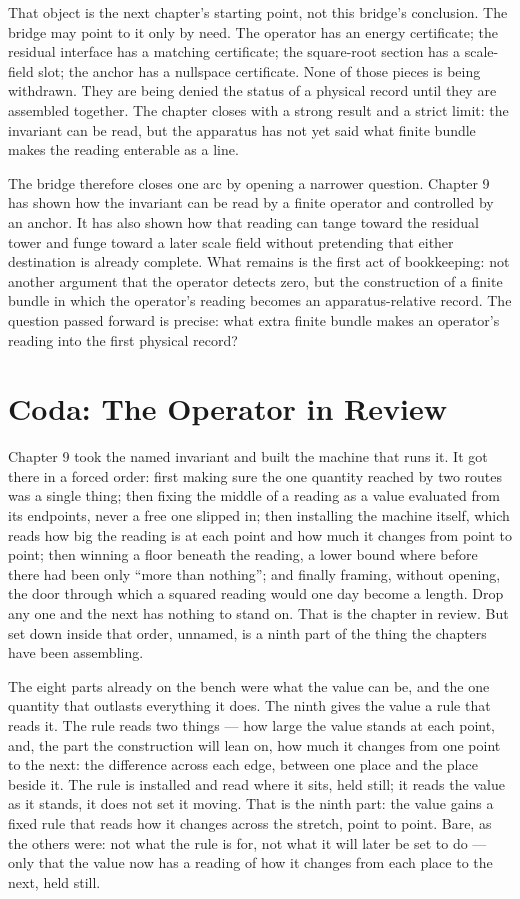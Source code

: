 That object is the next chapter's starting point, not this bridge's conclusion.
The bridge may point to it only by need. The operator has an energy certificate;
the residual interface has a matching certificate; the square-root section has a
scale-field slot; the anchor has a nullspace certificate. None of those pieces is
being withdrawn. They are being denied the status of a physical record until they
are assembled together. The chapter closes with a strong result and a strict
limit: the invariant can be read, but the apparatus has not yet said what finite
bundle makes the reading enterable as a line.

The bridge therefore closes one arc by opening a narrower question. Chapter 9 has
shown how the invariant can be read by a finite operator and controlled by an
anchor. It has also shown how that reading can tange toward the residual tower
and funge toward a later scale field without pretending that either destination is
already complete. What remains is the first act of bookkeeping: not another argument
that the operator detects zero, but the construction of a finite bundle in which
the operator's reading becomes an apparatus-relative record. The question passed
forward is precise: what extra finite bundle makes an operator's reading into the
first physical record?

\section*{Coda: The Operator in Review}

Chapter 9 took the named invariant and built the machine that runs it. It got there in a forced order: first making sure the one quantity reached by two routes was a single thing; then fixing the middle of a reading as a value evaluated from its endpoints, never a free one slipped in; then installing the machine itself, which reads how big the reading is at each point and how much it changes from point to point; then winning a floor beneath the reading, a lower bound where before there had been only ``more than nothing''; and finally framing, without opening, the door through which a squared reading would one day become a length. Drop any one and the next has nothing to stand on. That is the chapter in review. But set down inside that order, unnamed, is a ninth part of the thing the chapters have been assembling.

The eight parts already on the bench were what the value can be, and the one quantity that outlasts everything it does. The ninth gives the value a rule that reads it. The rule reads two things --- how large the value stands at each point, and, the part the construction will lean on, how much it changes from one point to the next: the difference across each edge, between one place and the place beside it. The rule is installed and read where it sits, held still; it reads the value as it stands, it does not set it moving. That is the ninth part: the value gains a fixed rule that reads how it changes across the stretch, point to point. Bare, as the others were: not what the rule is for, not what it will later be set to do --- only that the value now has a reading of how it changes from each place to the next, held still.


